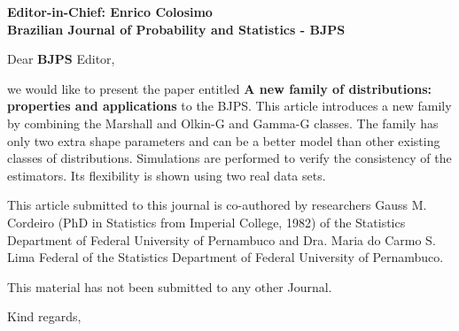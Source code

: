 \documentclass[version=last,12pt,{"/home/prdm0/R/x86_64-pc-linux-gnu-library/4.0/komaletter/rmarkdown/templates/pdf/resources/maintainersDelight"},letterpaper,]{scrlttr2}
\begin{document}
\begin{letter}{\textbf{Editor-in-Chief: Enrico
Colosimo}\\\textbf{Brazilian Journal of Probability and Statistics -
BJPS}\\}
\opening{Dear \textbf{BJPS} Editor,}

we would like to present the paper entitled \textbf{A new family of
distributions: properties and applications} to the BJPS. This article
introduces a new family by combining the Marshall and Olkin-G and
Gamma-G classes. The family has only two extra shape parameters and can
be a better model than other existing classes of distributions.
Simulations are performed to verify the consistency of the estimators.
Its flexibility is shown using two real data sets.

This article submitted to this journal is co-authored by researchers
Gauss M. Cordeiro (PhD in Statistics from Imperial College, 1982) of the
Statistics Department of Federal University of Pernambuco and Dra. Maria
do Carmo S. Lima Federal of the Statistics Department of Federal
University of Pernambuco.

This material has not been submitted to any other Journal.

\closing{Kind regards,}




\end{letter}
\end{document}
